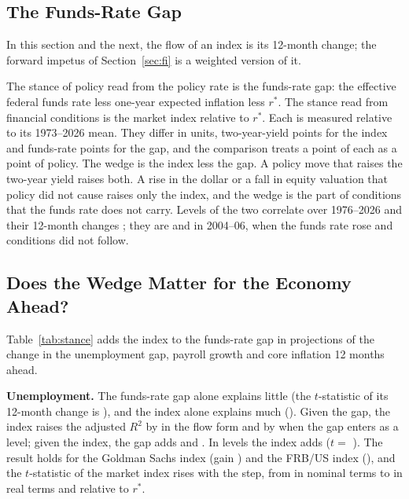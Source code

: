 \documentclass[11pt]{article}
\newcommand{\rs}{r^{*}}
\begin{document}
\subsection{The Funds-Rate Gap}\label{sec:wedge}
In this section and the next, the flow of an index is its 12-month change; the forward impetus of Section~\ref{sec:fi} is a weighted version of it.

The stance of policy read from the policy rate is the funds-rate gap: the effective federal funds rate less one-year expected inflation less $\rs$. The stance read from financial conditions is the market index relative to $\rs$. Each is measured relative to its 1973--2026 mean. They differ in units, two-year-yield points for the index and funds-rate points for the gap, and the comparison treats a point of each as a point of policy. The wedge is the index less the gap. A policy move that raises the two-year yield raises both. A rise in the dollar or a fall in equity valuation that policy did not cause raises only the index, and the wedge is the part of conditions that the funds rate does not carry. Levels of the two correlate  over 1976--2026 and their 12-month changes ; they are  and  in 2004--06, when the funds rate rose and conditions did not follow.

\subsection{Does the Wedge Matter for the Economy Ahead?}\label{sec:stancetest}
Table~\ref{tab:stance} adds the index to the funds-rate gap in projections of the change in the unemployment gap, payroll growth and core inflation 12 months ahead.



\textbf{Unemployment.} The funds-rate gap alone explains little (the $t$-statistic of its 12-month change is ), and the index alone explains much (). Given the gap, the index raises the adjusted $R^2$ by  in the flow form and by  when the gap enters as a level; given the index, the gap adds  and . In levels the index adds  ($t=$ ). The result holds for the Goldman Sachs index (gain ) and the FRB/US index (), and the $t$-statistic of the market index rises with the step, from  in nominal terms to  in real terms and  relative to $\rs$.
\end{document}

